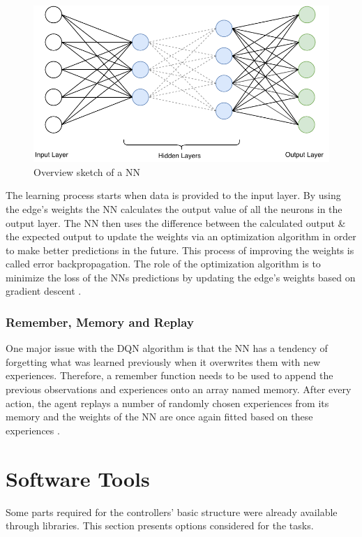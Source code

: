 \begin{figure}[h]
    \centering
    \includegraphics[scale=1]{Images/NNoverview.pdf}
    \caption{Overview sketch of a NN}
    \label{fig:NNoverview}
\end{figure}

\noindent The learning process starts when data is provided to the input layer. By using the edge's weights the NN calculates the output value of all the neurons in the output layer. The NN then uses the difference between the calculated output \& the expected output to update the weights via an optimization algorithm in order to make better predictions in the future. This process of improving the weights is called error backpropagation. The role of the optimization algorithm is to minimize the loss of the NNs predictions by updating the edge's weights based on gradient descent \cite{SiddiqueNH2013Ciso}.  

\subsubsection{Remember, Memory and Replay}
\noindent One major issue with the DQN algorithm is that the NN has a tendency of forgetting what was learned previously when it overwrites them with new experiences. Therefore, a remember function needs to be used to append the previous observations and experiences onto an array named memory. After every action, the agent replays a number of randomly chosen experiences from its memory and the weights of the NN are once again fitted based on these experiences \cite{lin1992self}. 


\section{Software Tools}
\label{sec:softwaretools}
Some parts required for the controllers' basic structure were already available through libraries. This section presents options considered for the tasks.


